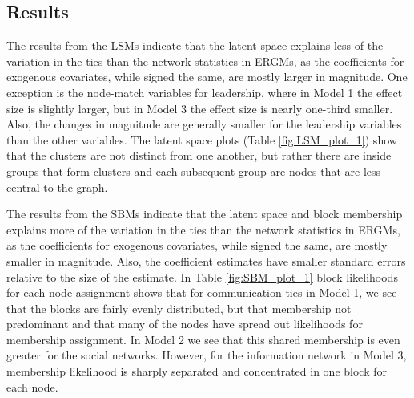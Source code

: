 \documentclass[fleqn,12pt]{wlscirep}
\begin{document}
\subsection{Results}


The results from the LSMs indicate that the latent space explains less of the variation in the ties than the network statistics in ERGMs, as the coefficients for exogenous covariates, while signed the same, are mostly larger in magnitude. One exception is the node-match variables for leadership, where in Model 1 the effect size is slightly larger, but in Model 3 the effect size is nearly one-third smaller. Also, the changes in magnitude are generally smaller for the leadership variables than the other variables. The latent space plots (Table \ref{fig:LSM_plot_1}) show that the clusters are not distinct from one another, but rather there are inside groups that form clusters and each subsequent group are nodes that are less central to the graph.

The results from the SBMs indicate that the latent space and block membership explains more of the variation in the ties than the network statistics in ERGMs, as the coefficients for exogenous covariates, while signed the same, are mostly smaller in magnitude. Also, the coefficient estimates have smaller standard errors relative to the size of the estimate. In Table \ref{fig:SBM_plot_1} block likelihoods for each node assignment shows that for communication ties in Model 1, we see that the blocks are fairly evenly distributed, but that membership not predominant and that many of the nodes have spread out likelihoods for membership assignment. In Model 2 we see that this shared membership is even greater for the social networks. However, for the information network in Model 3, membership likelihood is sharply separated and concentrated in one block for each node.
\end{document}
